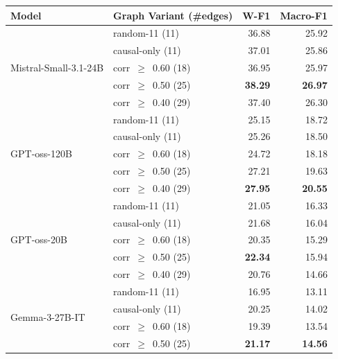 \begin{table}[t]
  \centering
  \small
  \setlength{\tabcolsep}{6pt}
  \renewcommand{\arraystretch}{1.2}
  \begin{tabular}{l l rr}
  \toprule
  \textbf{Model} & \textbf{Graph Variant (\#edges)} & \textbf{W-F1} & \textbf{Macro-F1} \\
  \midrule
  \multirow{5}{*}{Mistral-Small-3.1-24B}
    & random-11        (11) & 36.88              & 25.92              \\
    & causal-only      (11) & 37.01              & 25.86              \\
    & corr~$\geq$~0.60 (18) & 36.95              & 25.97              \\
    & corr~$\geq$~0.50 (25) & \textbf{38.29}     & \textbf{26.97}     \\
    & corr~$\geq$~0.40 (29) & 37.40              & 26.30              \\[3pt]
  \multirow{5}{*}{GPT-oss-120B}
    & random-11        (11) & 25.15              & 18.72              \\
    & causal-only      (11) & 25.26              & 18.50              \\
    & corr~$\geq$~0.60 (18) & 24.72              & 18.18              \\
    & corr~$\geq$~0.50 (25) & 27.21              & 19.63              \\
    & corr~$\geq$~0.40 (29) & \textbf{27.95}     & \textbf{20.55}     \\[3pt]
  \multirow{5}{*}{GPT-oss-20B}
    & random-11        (11) & 21.05              & 16.33              \\
    & causal-only      (11) & 21.68              & 16.04              \\
    & corr~$\geq$~0.60 (18) & 20.35              & 15.29              \\
  & corr~$\geq$~0.50 (25) & \textbf{22.34}     & 15.94              \\
    & corr~$\geq$~0.40 (29) & 20.76              & 14.66              \\[3pt]
  \multirow{5}{*}{Gemma-3-27B-IT}
    & random-11        (11) & 16.95              & 13.11              \\
    & causal-only      (11) & 20.25              & 14.02              \\
    & corr~$\geq$~0.60 (18) & 19.39              & 13.54              \\
  & corr~$\geq$~0.50 (25) & \textbf{21.17}     & \textbf{14.56}     \\

\end{tabular}
\end{table}
